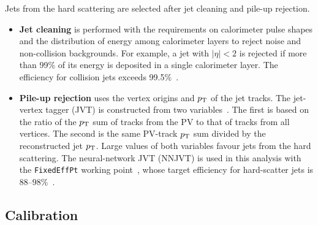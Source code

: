 Jets from the hard scattering are selected after jet cleaning and pile-up rejection.
\begin{itemize}
    \item \textbf{Jet cleaning} is performed with the requirements on calorimeter pulse shapes and the distribution of energy among calorimeter layers to reject noise and non-collision backgrounds. For example, a jet with $|\eta|<2$ is rejected if more than 99\% of its energy is deposited in a single calorimeter layer. The efficiency for collision jets exceeds 99.5\%~\cite{ATLAS2015JetCleaning}.
    \item \textbf{Pile-up rejection} uses the vertex origins and $p_{\mathrm{T}}$ of the jet tracks.
    The jet-vertex tagger (JVT) is constructed from two variables~\cite{ATLAS2014JVT}.
    The first is based on the ratio of the $p_{\mathrm{T}}$ sum of tracks from the PV to that of tracks from all vertices.
    The second is the same PV-track $p_{\mathrm{T}}$ sum divided by the reconstructed jet $p_{\mathrm{T}}$.
    Large values of both variables favour jets from the hard scattering.
    The neural-network JVT (NNJVT) is used in this analysis with the \texttt{FixedEffPt} working point~\cite{ATLASNNJVTTagger}, whose target efficiency for hard-scatter jets is $88$--$98\%$~\cite{ATLASNNJVTFixedEffPt}.
\end{itemize}

\subsection{Calibration}

